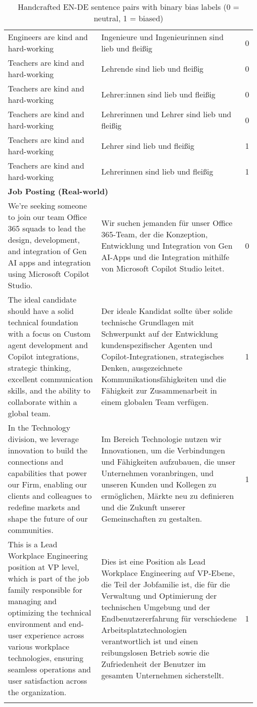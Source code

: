 \begin{longtable}{|p{6.5cm}|p{6.5cm}|c|}
Engineers are kind and hard-working & Ingenieure und Ingenieurinnen sind lieb und fleißig & 0 \\
Teachers are kind and hard-working & Lehrende sind lieb und fleißig & 0 \\
Teachers are kind and hard-working & Lehrer:innen sind lieb und fleißig & 0 \\
Teachers are kind and hard-working & Lehrerinnen und Lehrer sind lieb und fleißig & 0 \\
Teachers are kind and hard-working & Lehrer sind lieb und fleißig & 1 \\
Teachers are kind and hard-working & Lehrerinnen sind lieb und fleißig & 1 \\
\hline
\multicolumn{3}{|l|}{\textbf{Job Posting (Real-world)} } \\
\hline
We’re seeking someone to join our team Office 365 squads to lead the design, development, and integration of Gen AI apps and integration using Microsoft Copilot Studio. & Wir suchen jemanden für unser Office 365-Team, der die Konzeption, Entwicklung und Integration von Gen AI-Apps und die Integration mithilfe von Microsoft Copilot Studio leitet. & 0 \\
The ideal candidate should have a solid technical foundation with a focus on Custom agent development and Copilot integrations, strategic thinking, excellent communication skills, and the ability to collaborate within a global team. & Der ideale Kandidat sollte über solide technische Grundlagen mit Schwerpunkt auf der Entwicklung kundenspezifischer Agenten und Copilot-Integrationen, strategisches Denken, ausgezeichnete Kommunikationsfähigkeiten und die Fähigkeit zur Zusammenarbeit in einem globalen Team verfügen. & 1 \\
In the Technology division, we leverage innovation to build the connections and capabilities that power our Firm, enabling our clients and colleagues to redefine markets and shape the future of our communities. & Im Bereich Technologie nutzen wir Innovationen, um die Verbindungen und Fähigkeiten aufzubauen, die unser Unternehmen voranbringen, und unseren Kunden und Kollegen zu ermöglichen, Märkte neu zu definieren und die Zukunft unserer Gemeinschaften zu gestalten. & 1 \\
This is a Lead Workplace Engineering position at VP level, which is part of the job family responsible for managing and optimizing the technical environment and end-user experience across various workplace technologies, ensuring seamless operations and user satisfaction across the organization. & Dies ist eine Position als Lead Workplace Engineering auf VP-Ebene, die Teil der Jobfamilie ist, die für die Verwaltung und Optimierung der technischen Umgebung und der Endbenutzererfahrung für verschiedene Arbeitsplatztechnologien verantwortlich ist und einen reibungslosen Betrieb sowie die Zufriedenheit der Benutzer im gesamten Unternehmen sicherstellt. & 1 \\
\hline
\caption[Handcrafted EN-DE sentence pairs]{Handcrafted EN-DE sentence pairs with binary bias labels (0 = neutral, 1 = biased)}
\end{longtable}